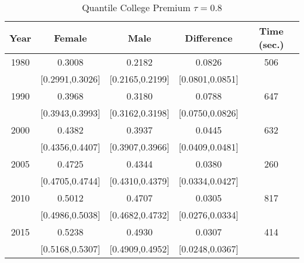\begin{table}[ht]
\centering
\begin{tabular}{ccccc}
  \hline
Year & Female & Male & Difference & Time (sec.) \\ 
  \hline
1980 & 0.3008 & 0.2182 & 0.0826 & 506 \\ 
   & [0.2991,0.3026] & [0.2165,0.2199] & [0.0801,0.0851] &  \\ 
  1990 & 0.3968 & 0.3180 & 0.0788 & 647 \\ 
   & [0.3943,0.3993] & [0.3162,0.3198] & [0.0750,0.0826] &  \\ 
  2000 & 0.4382 & 0.3937 & 0.0445 & 632 \\ 
   & [0.4356,0.4407] & [0.3907,0.3966] & [0.0409,0.0481] &  \\ 
  2005 & 0.4725 & 0.4344 & 0.0380 & 260 \\ 
   & [0.4705,0.4744] & [0.4310,0.4379] & [0.0334,0.0427] &  \\ 
  2010 & 0.5012 & 0.4707 & 0.0305 & 817 \\ 
   & [0.4986,0.5038] & [0.4682,0.4732] & [0.0276,0.0334] &  \\ 
  2015 & 0.5238 & 0.4930 & 0.0307 & 414 \\ 
   & [0.5168,0.5307] & [0.4909,0.4952] & [0.0248,0.0367] &  \\ 
   \hline
\end{tabular}
\caption{Quantile College Premium $\tau=0.8$} 
\end{table}
